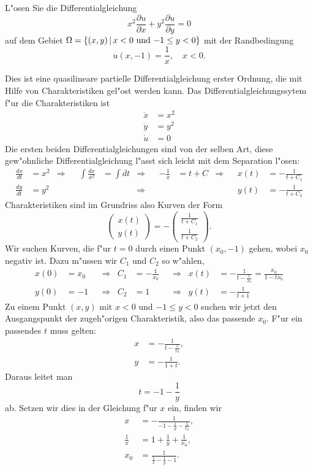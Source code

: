L"osen Sie die Differentialgleichung
\[
x^2\frac{\partial u}{\partial x}+y^2\frac{\partial u}{\partial y}=0
\]
auf dem Gebiet $\Omega=\{(x,y)\,|\,\text{$ x< 0$ und $-1\le y<0$}\}$ mit der Randbedingung
\[
u(x,-1)=\frac1x,\quad x<0.
\]

\begin{loesung}
Dies ist eine quasilineare partielle Differentialgleichung
erster Ordnung, die mit Hilfe von Charakteristiken gel"ost werden
kann. Das Differentialgleichungssytem f"ur die Charakteristiken ist
\begin{align*}
\dot x&=x^2\\
\dot y&=y^2\\
\dot u&=0
\end{align*}
Die ersten beiden Differentialgleichungen sind von der selben Art, diese
gew"ohnliche Differentialgleichung l"asst sich leicht mit dem Separation l"osen:
\begin{align*}
\frac{dx}{dt}&=x^2
&\Rightarrow&
&\int\frac{dx}{x^2}&=\int dt
&\Rightarrow&
&-\frac1x&=t+C
&\Rightarrow&
&x(t)&=-\frac1{t+C_1}
\\
\frac{dy}{dt}&=y^2
&&
&&
&\Rightarrow&
&&
&&
&y(t)&=-\frac1{t+C_2}
\end{align*}
Charakteristiken sind im Grundriss also Kurven der Form
\[
\begin{pmatrix}x(t)\\y(t)\end{pmatrix}
=-\begin{pmatrix}\frac1{t+C_1}\\\frac1{t+C_2}\end{pmatrix}.
\]
Wir suchen Kurven, die f"ur $t=0$ durch einen Punkt $(x_0,-1)$ gehen, wobei
$x_0$ negativ ist. Dazu m"ussen wir $C_1$ und $C_2$ so w"ahlen,
\begin{align*}
x(0)&=x_0&&\Rightarrow&C_1&=-\frac1{x_0}&&\Rightarrow&x(t)&=-\frac1{t-\frac1{x_0}}=\frac{x_0}{1-tx_0}\\
y(0)&=-1&&\Rightarrow&C_2&=1&&\Rightarrow&y(t)&=-\frac1{t+1}
\end{align*}
Zu einem Punkt $(x,y)$ mit $x<0$ und $-1\le y<0$ suchen wir jetzt den Ausgangspunkt
der zugeh"origen Charakteristik, also das passende $x_0$. F"ur ein
passendes $t$ muss gelten:
\begin{align*}
x&=-\frac{1}{t-\frac1{x_0}},\\
y&=-\frac{1}{1+t}.
\end{align*}
Daraus leitet man
\[
t=-1-\frac1{y}
\]
ab.
Setzen wir dies in der Gleichung f"ur $x$ ein, finden wir
\begin{align*}
x&=-\frac{1}{-1-\frac1y-\frac1{x_0}},\\
\frac1x&=1+\frac1y+\frac1{x_0},\\
x_0&=\frac{1}{\frac1x-\frac1y-1}.
\end{align*}


\end{loesung}
